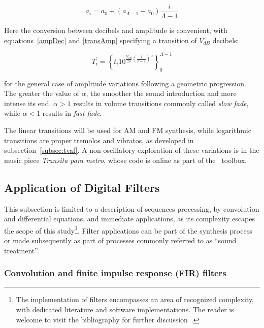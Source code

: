 \begin{equation}\label{seqAmpLin}
a_i=a_0 + (a_{\Lambda-1}-a_0)\frac{i}{\Lambda-1}
\end{equation}

Here the conversion between decibels and amplitude is convenient, with equations~\ref{ampDec} and \ref{transAmp} specifying a transition of $V_{dB}$ decibels:

\begin{equation}\label{seqAmpDB}
T_i^{'}=\left\{ t_i 10^{\frac{V_{dB}}{20}\left( \frac{i}{\Lambda-1} \right)^\alpha} \right\}_0^{\Lambda-1}
\end{equation}

\noindent for the general case of amplitude variations following a geometric progression. The greater the value of $\alpha$, the smoother the sound introduction and more intense its end. $\alpha>1$ results in volume transitions commonly called \emph{slow fade}, while $\alpha<1$ results in \emph{fast fade}\cite{guillaume}.

The linear transitions will be used for AM and FM synthesis, while logarithmic transitions are proper tremolos and vibratos, as developed in subsection~\ref{subsec:tvaf}. A non-oscillatory exploration of these variations is in the music piece \emph{Transita para metro}, whose code is online as part of the \massa\ toolbox\cite{MASSA}.


\subsection{Application of Digital Filters}\label{subsec:filtros}

This subsection is limited to a description of sequences processing, by convolution and differential equations, and immediate applications, as its complexity escapes the scope of this study\footnote{The implementation of filters encompasses an area of recognized complexity, with dedicated literature and software implementations. The reader is welcome to visit the bibliography for further discussion~\cite{Openheim,smith}.}. Filter applications can be part of the synthesis process or made subsequently as part of processes commonly referred to as ``sound treatment''.

\subsubsection{Convolution and finite impulse response (FIR) filters}

